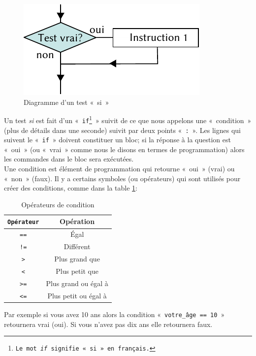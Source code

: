\begin{figure}[ht]
\centering
\includegraphics[scale=1.5]{images/Cf-if-fr.pdf}
\caption{Diagramme d'un test «~si~»}
\label{fig:Cf-if-fr}
\end{figure}

Un test \emph{si} est fait d'un «~\texttt{if\footnote{Le mot \emph{if} signifie «~si~» en français.}}~» suivit de ce que nous appelons une «~condition~»  (plus de  détails dans une seconde) suivit par deux points «~\verb+:+~». Les lignes qui suivent le «~\texttt{if}~» doivent constituer un bloc; si la réponse à la question est «~oui~» (ou «~vrai~» comme nous le disons en termes de programmation) alors les commandes dans le bloc sera exécutées.\\

Une condition est élément de programmation qui retourne «~oui~» (vrai) ou «~non~» (faux). Il y a certains symboles (ou opérateurs) qui sont utilisés pour créer des conditions, comme dans la table \ref{table:opcond}:

\begin{table}[h!]
\begin{center}
\begin{tabular}{|c|c|}
\hline
\texttt{Opérateur}&Opération\\
\hline
\texttt{==}&Égal\\
\hline
\texttt{!=}&Différent\\
\hline
\texttt{>}&Plus grand que\\
\hline
\texttt{<}&Plus petit que\\
\hline
\texttt{>=}&Plus grand ou égal à\\
\hline
\texttt{<=}&Plus petit ou égal à\\
\hline
\end{tabular}
\end{center}
\caption{Opérateurs de condition}
\label{table:opcond}
\end{table}

Par exemple si vous avez 10 ans alors la condition «~\texttt{votre\_âge == 10}~» retournera vrai (oui). Si vous n'avez pas dix ans  elle retournera faux. \\

